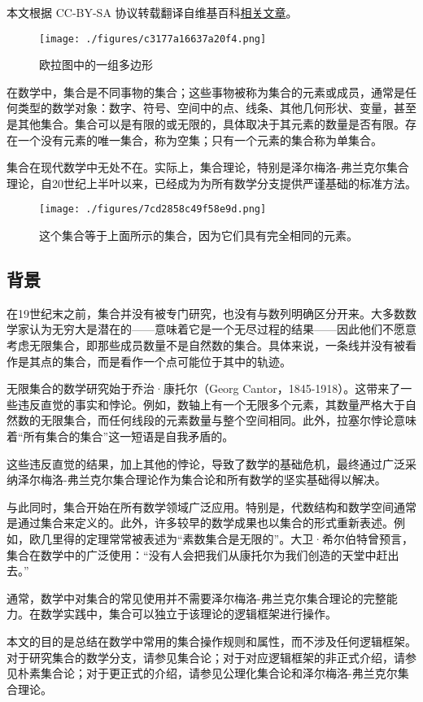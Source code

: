 
本文根据 CC-BY-SA 协议转载翻译自维基百科\href{https://en.wikipedia.org/wiki/Set_(mathematics)}{相关文章}。

\begin{figure}[ht]
\centering
\texttt{[image: ./figures/c3177a16637a20f4.png]}
\caption{欧拉图中的一组多边形} \label{fig_JHSX_1}
\end{figure}
在数学中，集合是不同事物的集合；这些事物被称为集合的元素或成员，通常是任何类型的数学对象：数字、符号、空间中的点、线条、其他几何形状、变量，甚至是其他集合。集合可以是有限的或无限的，具体取决于其元素的数量是否有限。存在一个没有元素的唯一集合，称为空集；只有一个元素的集合称为单集合。

集合在现代数学中无处不在。实际上，集合理论，特别是泽尔梅洛-弗兰克尔集合理论，自20世纪上半叶以来，已经成为为所有数学分支提供严谨基础的标准方法。
\begin{figure}[ht]
\centering
\texttt{[image: ./figures/7cd2858c49f58e9d.png]}
\caption{这个集合等于上面所示的集合，因为它们具有完全相同的元素。} \label{fig_JHSX_2}
\end{figure}
\subsection{背景}
在19世纪末之前，集合并没有被专门研究，也没有与数列明确区分开来。大多数数学家认为无穷大是潜在的——意味着它是一个无尽过程的结果——因此他们不愿意考虑无限集合，即那些成员数量不是自然数的集合。具体来说，一条线并没有被看作是其点的集合，而是看作一个点可能位于其中的轨迹。

无限集合的数学研究始于乔治·康托尔（Georg Cantor，1845-1918）。这带来了一些违反直觉的事实和悖论。例如，数轴上有一个无限多个元素，其数量严格大于自然数的无限集合，而任何线段的元素数量与整个空间相同。此外，拉塞尔悖论意味着“所有集合的集合”这一短语是自我矛盾的。

这些违反直觉的结果，加上其他的悖论，导致了数学的基础危机，最终通过广泛采纳泽尔梅洛-弗兰克尔集合理论作为集合论和所有数学的坚实基础得以解决。

与此同时，集合开始在所有数学领域广泛应用。特别是，代数结构和数学空间通常是通过集合来定义的。此外，许多较早的数学成果也以集合的形式重新表述。例如，欧几里得的定理常常被表述为“素数集合是无限的”。大卫·希尔伯特曾预言，集合在数学中的广泛使用：“没有人会把我们从康托尔为我们创造的天堂中赶出去。”

通常，数学中对集合的常见使用并不需要泽尔梅洛-弗兰克尔集合理论的完整能力。在数学实践中，集合可以独立于该理论的逻辑框架进行操作。

本文的目的是总结在数学中常用的集合操作规则和属性，而不涉及任何逻辑框架。对于研究集合的数学分支，请参见集合论；对于对应逻辑框架的非正式介绍，请参见朴素集合论；对于更正式的介绍，请参见公理化集合论和泽尔梅洛-弗兰克尔集合理论。